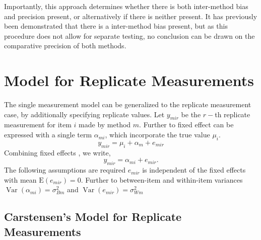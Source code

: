 \documentclass[12pt, a4paper]{report}
\theoremstyle{plain}
\theoremstyle{definition}
\theoremstyle{remark}
\begin{document}
Importantly, this approach determines whether there is both inter-method bias and precision present, or alternatively if there is neither present. It has previously been demonstrated that there is a inter-method bias present, but as this procedure does not
allow for separate testing, no conclusion can be drawn on the
comparative precision of both methods.









\section{Model for Replicate Measurements}

The single measurement model can be generalized to the replicate measurement case, by additionally specifying replicate values. Let $y_{mir}$ be the $r-$th replicate measurement for item $i$ made by method $m$. Further to \citet{Barnhart} fixed effect can be expressed with a single term $\alpha_{mi}$, which incorporate the true value $\mu_i$.
\[ y_{mir} = \mu_{i} + \alpha_{m} + e_{mir}  \]
Combining fixed effects \citep{Barnhart}, we write,
\[ y_{mir} = \alpha_{mi} + e_{mir}.\]
The following assumptions are required
$e_{mir}$ is independent of the fixed effects with mean $\mbox{E}(e_{mir}) = 0$.
Further to \citet{Barnhart} between-item and within-item variances $\operatorname{Var}(\alpha_{mi}) = \sigma^2_{Bm}$ and $\operatorname{Var}(e_{mir}) = \sigma^2_{Wm}$		


\subsection{Carstensen's Model for Replicate Measurements}
\end{document}
